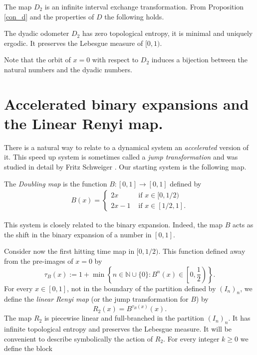 \documentclass[letterpaper,10pt,reqno]{amsart}
\numberwithin{equation}{section}     %
\newcommand{\N}{\mathbb{N}}
\def\N{{\mathbb N}}
\begin{document}
The map $D_2$ is an infinite interval exchange transformation. From Proposition \ref{con_d} and the properties of $D$ the following holds.

\begin{proposition} \label{erg_odometro}
The  dyadic odometer $D_2$ has zero topological entropy, it is minimal and uniquely ergodic. It preserves the Lebesgue measure of $[0,1)$.  
\end{proposition} 

\begin{remark} \label{orbita_diadica}
Note that the orbit of $x=0$ with respect to $D_2$ induces a bijection between the natural numbers and the dyadic numbers. 
\end{remark}
 
 
 
 
 
 
 
 
 




\section{Accelerated binary expansions and the Linear Renyi map.}

There is a natural way to relate to a dynamical system an \emph{accelerated} version of it. This speed up system is sometimes called {{}{a}}  \emph{jump transformation} and was studied in detail by  Fritz Schweiger \cite{sc}. Our starting system is the following map.
\begin{definition}
The \emph{Doubling map} is the function $B:[0,1] \to [0,1]$ defined by
\begin{eqnarray*}
B(x)=
\begin{cases}
2x & \text{ if } x \in [0,1/2) \\
2x-1& \text{ if } x \in [1/2, 1].
\end{cases}
\end{eqnarray*}
\end{definition}
This system is closely  related to the binary expansion. Indeed, the map $B$ acts as the shift in the binary expansion of a number in $[0,1]$.


Consider now the first hitting time map in  $[0,1/2)$. This function  defined away from the pre-images of $x=0$ by
\begin{equation*}
\tau_B(x):= 1 + \min \left\{n \in \N \cup\{0\} : 	B^n(x) \in \left[0, \frac{1}{2} \right)	\right\}.
\end{equation*}
For every $x \in [0,1]$, not in the boundary  of the partition defined by $(I_n)_n$, we define the \emph{linear Renyi map} (or the jump transformation for $B$) by
\begin{equation*}
R_2(x)= B^{\tau_B(x)}(x).
\end{equation*}
The map $R_2$ is  piecewise linear and full-branched in the partition $(I_n)_n$. It has infinite topological entropy and preserves the Lebesgue measure. It  will be convenient to describe symbolically the action of $R_2$.  For every integer $k \geq 0$ we  define the block
\end{document}
